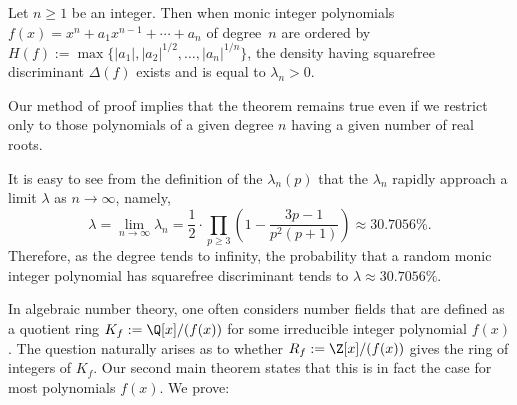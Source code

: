 \begin{theorem}
\notready\label{polydisc2}
Let $n\geq1$ be an integer.  Then when
monic integer polynomials $f(x)=x^n+a_1x^{n-1}+\cdots+a_n$ of
degree~$n$ are ordered by $H(f):=
\max\{|a_1|,|a_2|^{1/2},\ldots,|a_n|^{1/n}\}$, the density having
squarefree discriminant $\Delta(f)$ exists and is equal to $\lambda_n>0$.
\end{theorem}
Our method of proof implies that the theorem remains true even if we
restrict only to those polynomials of a given degree $n$ having a
given number of real roots.

It is easy to see from the definition of the $\lambda_n(p)$ that the
$\lambda_n$ rapidly approach a limit $\lambda$ as $n\to\infty$,
namely,
\begin{equation}
\lambda=\lim_{n\to\infty} \lambda_n = \frac12 \cdot \prod_{p\geq 3}
\left(1-\frac{3p-1}{p^2(p+1)}\right)
\approx 30.7056\%.
\end{equation}
Therefore, as the degree tends to infinity, the
probability that a random monic integer polynomial has squarefree
discriminant tends to $\lambda\approx 30.7056\%$.

In algebraic number theory, one often considers number fields that are
defined as a quotient ring $K_f:=\Q[x]/(f(x))$ for some irreducible
integer polynomial $f(x)$. The question naturally arises as to whether
$R_f:=\Z[x]/(f(x))$ gives the ring of integers of $K_f$.  Our second
main theorem states that this is in fact the case for {most}
polynomials $f(x)$. We prove:

